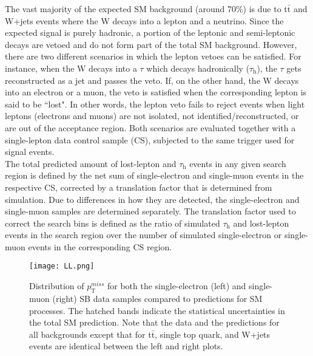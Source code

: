 The vast majority of the expected SM background (around 70\%) is due to t$\bar{\text{t}}$ and W+jets events where the W decays into a lepton and a neutrino. Since the expected signal is purely hadronic, a portion of the leptonic and semi-leptonic decays are vetoed and do not form part of the total SM background. However, there are two different scenarios in which the lepton vetoes can be satisfied. For instance, when the W decays into a $\tau$ which decays hadronically ($\tau_\text{h}$), the $\tau$ gets reconstructed as a jet and passes the veto. If, on the other hand, the W decays into an electron or a muon, the veto is satisfied when the corresponding lepton is said to be ``lost". In other words, the lepton veto fails to reject events when light leptons (electrons and muons) are not isolated, not identified/reconstructed, or are out of the acceptance region. Both scenarios are evaluated together with a single-lepton data control sample (CS), subjected to the same trigger used for signal events.\\

The total predicted amount of lost-lepton and $\tau_\text{h}$ events in any given search region is defined by the net sum of single-electron and single-muon events in the respective CS, corrected by a translation factor that is determined from simulation. Due to differences in how they are detected, the single-electron and single-muon samples are determined separately. The translation factor used to correct the search bins is defined as the ratio of simulated $\tau_\text{h}$ and lost-lepton events in the search region over the number of simulated single-electron or single-muon events in the corresponding CS region.

\begin{figure}[H]
	\begin{center}
		\texttt{[image: LL.png]} 
		\caption{Distribution of $p_{\text{T}}^{miss}$ for both the single-electron (left) and single-muon (right) SB data samples compared to predictions for SM processes. The hatched bands indicate the statistical uncertainties in the total SM prediction. Note that the data and the predictions for all backgrounds except that for t$\bar{\text{t}}$, single top quark, and W+jets events are identical between the left and right plots.}
		\label{LL} 
	\end{center}
\end{figure}

